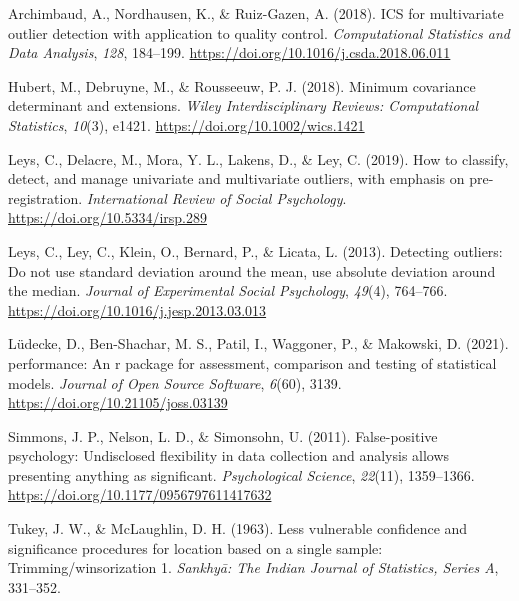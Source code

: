 \documentclass[
]{article}
\newlength{\cslhangindent}
\newlength{\cslentryspacingunit} %
\newenvironment{CSLReferences}[2] %
 {%
  \setlength{\parindent}{0pt}
  \ifodd #1
  \let\oldpar\par
  \def\par{\hangindent=\cslhangindent\oldpar}
  \fi
  \setlength{\parskip}{#2\cslentryspacingunit}
 }%
 {}
\begin{document}
\hypertarget{refs}{}
\begin{CSLReferences}{1}{0}
\leavevmode{}%
Archimbaud, A., Nordhausen, K., \& Ruiz-Gazen, A. (2018). ICS for multivariate outlier detection with application to quality control. \emph{Computational Statistics and Data Analysis}, \emph{128}, 184--199. \url{https://doi.org/10.1016/j.csda.2018.06.011}

\leavevmode{}%
Hubert, M., Debruyne, M., \& Rousseeuw, P. J. (2018). Minimum covariance determinant and extensions. \emph{Wiley Interdisciplinary Reviews: Computational Statistics}, \emph{10}(3), e1421. \url{https://doi.org/10.1002/wics.1421}

\leavevmode{}%
Leys, C., Delacre, M., Mora, Y. L., Lakens, D., \& Ley, C. (2019). How to classify, detect, and manage univariate and multivariate outliers, with emphasis on pre-registration. \emph{International Review of Social Psychology}. \url{https://doi.org/10.5334/irsp.289}

\leavevmode{}%
Leys, C., Ley, C., Klein, O., Bernard, P., \& Licata, L. (2013). Detecting outliers: Do not use standard deviation around the mean, use absolute deviation around the median. \emph{Journal of Experimental Social Psychology}, \emph{49}(4), 764--766. \url{https://doi.org/10.1016/j.jesp.2013.03.013}

\leavevmode{}%
Lüdecke, D., Ben-Shachar, M. S., Patil, I., Waggoner, P., \& Makowski, D. (2021). {performance}: An r package for assessment, comparison and testing of statistical models. \emph{Journal of Open Source Software}, \emph{6}(60), 3139. \url{https://doi.org/10.21105/joss.03139}

\leavevmode{}%
Simmons, J. P., Nelson, L. D., \& Simonsohn, U. (2011). False-positive psychology: Undisclosed flexibility in data collection and analysis allows presenting anything as significant. \emph{Psychological Science}, \emph{22}(11), 1359--1366. \url{https://doi.org/10.1177/0956797611417632}

\leavevmode{}%
Tukey, J. W., \& McLaughlin, D. H. (1963). Less vulnerable confidence and significance procedures for location based on a single sample: Trimming/winsorization 1. \emph{Sankhy{ā}: The Indian Journal of Statistics, Series A}, 331--352.

\end{CSLReferences}
\end{document}
